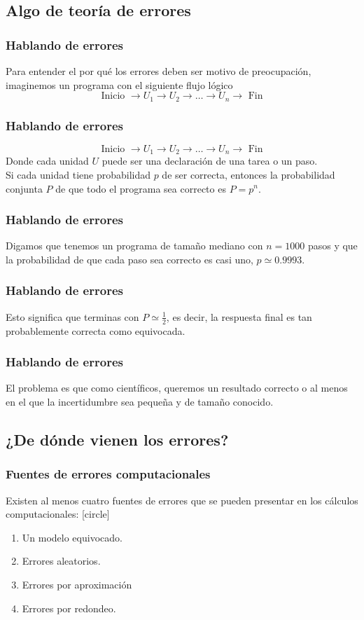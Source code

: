\subsection{Algo de teoría de errores}
\begin{frame}
\frametitle{Hablando de errores}
Para entender el por qué los errores deben ser motivo de preocupación, imaginemos un programa con el siguiente flujo lógico
\begin{equation}
\text{Inicio } \rightarrow U_{1} \rightarrow U_{2} \rightarrow \ldots \rightarrow U_{n} \rightarrow \text{ Fin} 
\label{eq:ecuacion_02_01}
\end{equation}
\end{frame}
\begin{frame}
\frametitle{Hablando de errores}
\begin{equation*}
\text{Inicio } \rightarrow U_{1} \rightarrow U_{2} \rightarrow \ldots \rightarrow U_{n} \rightarrow \text{ Fin} 
\end{equation*}
Donde cada unidad $U$ puede ser una declaración de una tarea o un paso.
\\
\bigskip
Si cada unidad tiene probabilidad $p$ de ser correcta, entonces la probabilidad conjunta $P$ de que todo el programa sea correcto es $P = p^{n}$.
\\
\end{frame}
\begin{frame}
\frametitle{Hablando de errores}
Digamos que tenemos un programa de tamaño mediano con $n = 1000$ pasos y que la probabilidad de que cada paso sea correcto es casi uno, $p \simeq 0.9993$.
\end{frame}
\begin{frame}
\frametitle{Hablando de errores}
Esto significa que terminas con $P \simeq \frac{1}{2}$, es decir, la respuesta final es tan probablemente correcta como equivocada.
\end{frame}
\begin{frame}
\frametitle{Hablando de errores}
El problema es que como científicos, queremos un resultado correcto o al menos en el que la incertidumbre sea pequeña y de tamaño conocido.
\end{frame}
\subsection{¿De dónde vienen los errores?}
\begin{frame}
\frametitle{Fuentes de errores computacionales}
Existen al menos cuatro fuentes de errores que se pueden presentar en los cálculos computacionales:
\pause
{}
[circle]
\begin{enumerate}[<+->]
\item Un modelo equivocado.
\item Errores aleatorios.
\item Errores por aproximación
\item Errores por redondeo.
\end{enumerate}
\end{frame}
